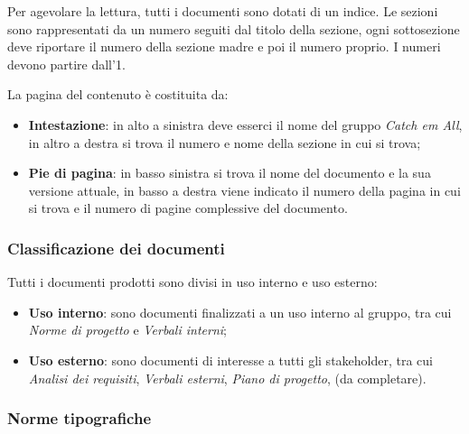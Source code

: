 Per agevolare la lettura, tutti i documenti sono dotati di un indice. Le sezioni sono rappresentati da un numero seguiti dal titolo della sezione, ogni sottosezione deve riportare il numero della sezione madre e poi il numero proprio. I numeri devono partire dall'1.

La pagina del contenuto è costituita da:
\begin{itemize}
    \item \textbf{Intestazione}: in alto a sinistra deve esserci il nome del gruppo \textit{Catch em All}, in altro a destra si trova il numero e nome della sezione in cui si trova;
    \item \textbf{Pie di pagina}: in basso sinistra si trova il nome del documento e la sua versione attuale, in basso a destra viene indicato il numero della pagina in cui si trova e il numero di pagine complessive del documento.
\end{itemize}

\subsubsection{Classificazione dei documenti}
Tutti i documenti prodotti sono divisi in uso interno e uso esterno:
\begin{itemize}
    \item \textbf{Uso interno}: sono documenti finalizzati a un uso interno al gruppo, tra cui \textit{Norme di progetto} e \textit{Verbali interni};
    \item \textbf{Uso esterno}: sono documenti di interesse a tutti gli stakeholder, tra cui \textit{Analisi dei requisiti}, \textit{Verbali esterni}, \textit{Piano di progetto}, (da completare).
\end{itemize}

\subsubsection{Norme tipografiche}

